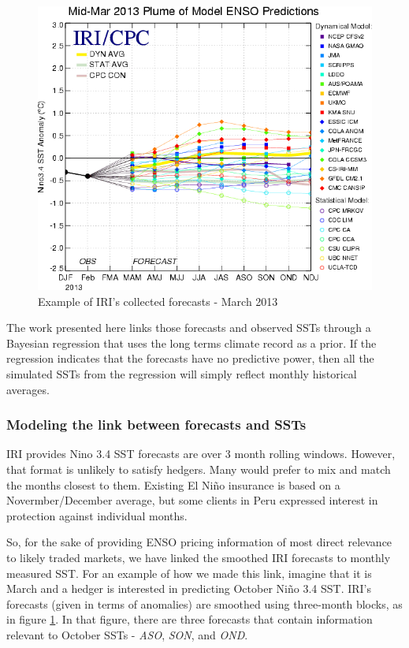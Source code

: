 \documentclass[authoryear]{article}
\begin{document}
\begin{figure}[!htbp]
  \includegraphics[width=\linewidth]{Pricingfigs/SST_table_march_ex}
  \caption{Example of IRI's collected forecasts - March 2013}
   \label{fig:forecastExamples}
\end{figure}

The work presented here links those forecasts and observed SSTs through a Bayesian regression that uses the long terms climate record as a prior. If the regression indicates that the forecasts have no predictive power, then all the simulated SSTs from the regression will simply reflect monthly historical averages. 

\subsubsection{Modeling the link between forecasts and SSTs}
IRI provides Nino 3.4 SST forecasts are over 3 month rolling windows. However, that format is unlikely to satisfy hedgers. Many would prefer to mix and match the months closest to them. Existing El Ni\~no insurance is based on a Novermber/December average, but some clients in Peru expressed interest in protection against individual months. 

So, for the sake of providing ENSO pricing information of most direct relevance to likely traded markets, we have linked the smoothed IRI forecasts to monthly measured SST. For an example of how we made this link, imagine that it is March and a hedger is interested in predicting October Ni\~no 3.4 SST. IRI's forecasts (given in terms of anomalies) are smoothed using three-month blocks, as in figure \ref{fig:forecastExamples}. In that figure, there are three forecasts that contain information relevant to October SSTs - \emph{ASO}, \emph{SON}, and \emph{OND}. 
\end{document}
